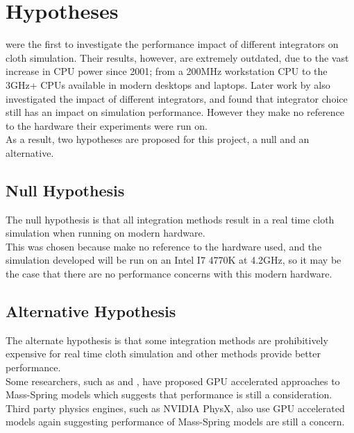 \section{Hypotheses}
\textcite{Volino2001} were the first to investigate the performance impact of different integrators on cloth simulation. Their results, however, are extremely outdated, due to the vast increase in CPU power since 2001; from a 200MHz workstation CPU to the 3GHz+ CPUs available in modern desktops and laptops. Later work by \textcite{Wang2009a} also investigated the impact of different integrators, and found that integrator choice still has an impact on simulation performance. However they make no reference to the hardware their experiments were run on.
\\As a result, two hypotheses are proposed for this project, a null and an alternative.

\subsection{Null Hypothesis}
The null hypothesis is that all integration methods result in a real time cloth simulation when running on modern hardware.
\\This was chosen because \textcite{Wang2009a} make no reference to the hardware used, and the simulation developed will be run on an Intel I7 4770K at 4.2GHz, so it may be the case that there are no performance concerns with this modern hardware.

\subsection{Alternative Hypothesis}
The alternate hypothesis is that some integration methods are prohibitively expensive for real time cloth simulation and other methods provide better performance.
\\Some researchers, such as \textcite{Zeller2005} and \textcite{Tang2013}, have proposed GPU accelerated approaches to Mass-Spring models which suggests that performance is still a consideration. Third party physics engines, such as NVIDIA \textsuperscript{\textregistered} PhysX\textsuperscript{\textregistered}, also use GPU accelerated models \parencite{Kim2011} again suggesting performance of Mass-Spring models are still a concern.

